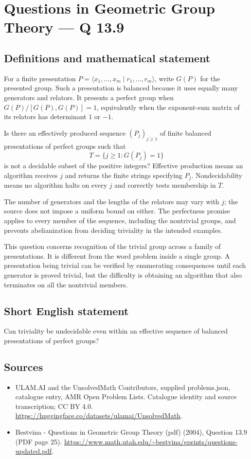 \documentclass[11pt,a4paper]{article}
\begin{document}
\section*{Questions in Geometric Group Theory — Q 13.9}\label{statement}

\subsection{Definitions and mathematical statement}
For a finite presentation $P=\langle x_1,\ldots,x_m\mid r_1,\ldots,r_m\rangle$, write $G(P)$ for the presented group. Such a presentation is balanced because it uses equally many generators and relators. It presents a perfect group when $G(P)/[G(P),G(P)]=1$, equivalently when the exponent-sum matrix of its relators has determinant $1$ or $-1$.

Is there an effectively produced sequence $(P_j)_{j\geq1}$ of finite balanced presentations of perfect groups such that
\[
 T=\{j\geq1:G(P_j)=1\}
\]
is not a decidable subset of the positive integers? Effective production means an algorithm receives $j$ and returns the finite strings specifying $P_j$. Nondecidability means no algorithm halts on every $j$ and correctly tests membership in $T$.

The number of generators and the lengths of the relators may vary with $j$; the source does not impose a uniform bound on either. The perfectness promise applies to every member of the sequence, including the nontrivial groups, and prevents abelianization from deciding triviality in the intended examples.

This question concerns recognition of the trivial group across a family of presentations. It is different from the word problem inside a single group. A presentation being trivial can be verified by enumerating consequences until each generator is proved trivial, but the difficulty is obtaining an algorithm that also terminates on all the nontrivial members.
\subsection{Short English statement}
Can triviality be undecidable even within an effective sequence of balanced presentations of perfect groups?
\subsection{Sources}
\begin{itemize}
\item[S1] ULAM.AI and the UnsolvedMath Contributors, supplied problems.json, catalogue entry, AMR Open Problem Lists. Catalogue identity and source transcription; CC BY 4.0.
\url{https://huggingface.co/datasets/ulamai/UnsolvedMath}.
\item[S2] Bestvina - Questions in Geometric Group Theory (pdf) (2004), Question 13.9 (PDF page 25). 
\url{https://www.math.utah.edu/~bestvina/eprints/questions-updated.pdf}.
\end{itemize}
\end{document}

